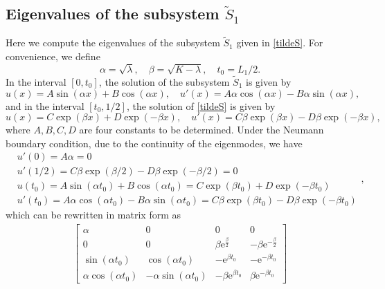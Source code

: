 \documentclass[a4paper,11pt]{article}
\begin{document}
\begin{appendices}
\subsection{Eigenvalues of the subsystem $\tilde{S}_1$}
Here we compute the eigenvalues of the subsystem $\tilde{S}_1$ given in \eqref{tildeS}. For convenience, we define
\begin{equation*}
\alpha = \sqrt{\lambda}, \quad \beta = \sqrt{K - \lambda}, \quad t_0 = L_1 / 2.
\end{equation*}
In the interval $[0, t_0]$, the solution of the subsystem $\tilde{S}_1$ is given by
\begin{equation*}
u(x) = A \sin(\alpha x) + B \cos(\alpha x), \quad u'(x) = A \alpha \cos(\alpha x) - B \alpha \sin(\alpha x),
\end{equation*}
and in the interval $[t_0, 1/2]$, the solution of \eqref{tildeS} is given by
\begin{equation*}
u(x) = C \exp(\beta x) + D \exp(-\beta x), \quad u'(x) = C \beta \exp(\beta x) - D \beta \exp(-\beta x),
\end{equation*}
where $A ,B, C, D$ are four constants to be determined. Under the Neumann boundary condition, due to the continuity of the eigenmodes, we have
\begin{equation*}
\begin{split}
&u'(0) = A \alpha = 0 \\
&u'(1/2) = C \beta \exp(\beta/2) - D \beta \exp(-\beta/2) = 0 \\
&u(t_0) = A \sin(\alpha t_0) + B \cos(\alpha t_0) = C \exp(\beta t_0) + D \exp(-\beta t_0) \\
&u'(t_0) = A \alpha \cos(\alpha t_0) - B \alpha \sin(\alpha t_0) = C \beta \exp(\beta t_0) - D \beta \exp(-\beta t_0)
\end{split},
\end{equation*}
which can be rewritten in matrix form as
\begin{equation*}
\begin{split}
\left[\begin{array}{cccc} \alpha & 0 & 0 & 0\\ 0 & 0 & \beta \mathrm{e}^{\frac{\beta}{2}} & - \beta \mathrm{e}^{-\frac{\beta}{2}}\\ \sin\!\left(\alpha t_0\right) & \cos\!\left(\alpha t_0\right) & - \mathrm{e}^{\beta t_0} & - \mathrm{e}^{- \beta t_0}\\ \alpha \cos\!\left(\alpha t_0\right) & - \alpha \sin\!\left(\alpha t_0\right) & - \beta \mathrm{e}^{\beta t_0} & \beta \mathrm{e}^{- \beta t_0} \end{array}\right]

\end{split}
\end{equation*}
\end{appendices}
\end{document}
